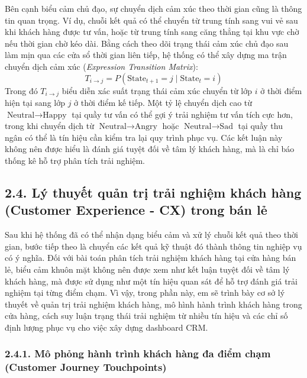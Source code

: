 Bên cạnh biểu cảm chủ đạo, sự chuyển dịch cảm xúc theo thời gian cũng là thông tin quan trọng. Ví dụ, chuỗi kết quả có thể chuyển từ trung tính sang vui vẻ sau khi khách hàng được tư vấn, hoặc từ trung tính sang căng thẳng tại khu vực chờ nếu thời gian chờ kéo dài. Bằng cách theo dõi trạng thái cảm xúc chủ đạo sau làm mịn qua các cửa sổ thời gian liên tiếp, hệ thống có thể xây dựng ma trận chuyển dịch cảm xúc (\textit{Expression Transition Matrix}):
\begin{equation}
T_{i \to j} = P(\text{State}_{t+1} = j \mid \text{State}_t = i)
\end{equation}
Trong đó $T_{i \to j}$ biểu diễn xác suất trạng thái cảm xúc chuyển từ lớp $i$ ở thời điểm hiện tại sang lớp $j$ ở thời điểm kế tiếp. Một tỷ lệ chuyển dịch cao từ $\text{Neutral} \to \text{Happy}$ tại quầy tư vấn có thể gợi ý trải nghiệm tư vấn tích cực hơn, trong khi chuyển dịch từ $\text{Neutral} \to \text{Angry}$ hoặc $\text{Neutral} \to \text{Sad}$ tại quầy thu ngân có thể là tín hiệu cần kiểm tra lại quy trình phục vụ. Các kết luận này không nên được hiểu là đánh giá tuyệt đối về tâm lý khách hàng, mà là chỉ báo thống kê hỗ trợ phân tích trải nghiệm.

\subsection*{2.4. Lý thuyết quản trị trải nghiệm khách hàng (Customer Experience - CX) trong bán lẻ}

Sau khi hệ thống đã có thể nhận dạng biểu cảm và xử lý chuỗi kết quả theo thời gian, bước tiếp theo là chuyển các kết quả kỹ thuật đó thành thông tin nghiệp vụ có ý nghĩa. Đối với bài toán phân tích trải nghiệm khách hàng tại cửa hàng bán lẻ, biểu cảm khuôn mặt không nên được xem như kết luận tuyệt đối về tâm lý khách hàng, mà được sử dụng như một tín hiệu quan sát để hỗ trợ đánh giá trải nghiệm tại từng điểm chạm. Vì vậy, trong phần này, em sẽ trình bày cơ sở lý thuyết về quản trị trải nghiệm khách hàng, mô hình hành trình khách hàng trong cửa hàng, cách suy luận trạng thái trải nghiệm từ nhiều tín hiệu và các chỉ số định lượng phục vụ cho việc  xây dựng dashboard CRM.

\subsubsection*{2.4.1. Mô phỏng hành trình khách hàng đa điểm chạm (Customer Journey Touchpoints)}

